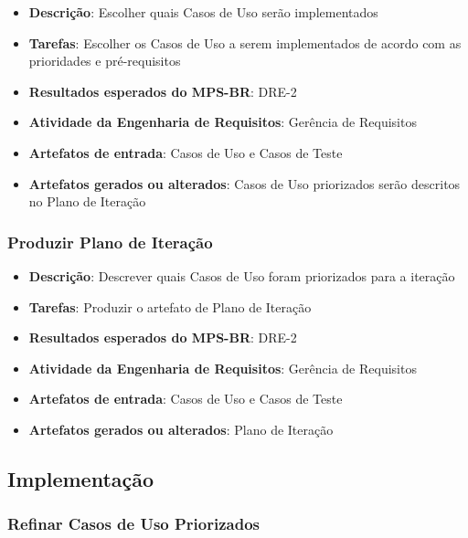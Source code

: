 \begin{itemize}
\item \textbf{Descrição}: Escolher quais Casos de Uso serão implementados
\item \textbf{Tarefas}: Escolher os Casos de Uso a serem implementados de acordo com as prioridades e pré-requisitos
\item \textbf{Resultados esperados do MPS-BR}: DRE-2
\item \textbf{Atividade da Engenharia de Requisitos}: Gerência de Requisitos
\item \textbf{Artefatos de entrada}: Casos de Uso e Casos de Teste
\item \textbf{Artefatos gerados ou alterados}: Casos de Uso priorizados serão descritos no Plano de Iteração
\end{itemize}

\subsubsection{Produzir Plano de Iteração}

\begin{itemize}
\item \textbf{Descrição}: Descrever quais Casos de Uso foram priorizados para a iteração
\item \textbf{Tarefas}: Produzir o artefato de Plano de Iteração
\item \textbf{Resultados esperados do MPS-BR}: DRE-2
\item \textbf{Atividade da Engenharia de Requisitos}: Gerência de Requisitos
\item \textbf{Artefatos de entrada}: Casos de Uso e Casos de Teste
\item \textbf{Artefatos gerados ou alterados}: Plano de Iteração
\end{itemize}

\subsection{Implementação}

\subsubsection{Refinar Casos de Uso Priorizados}

